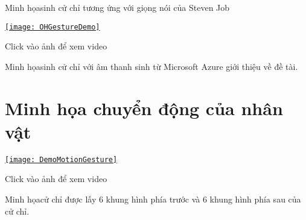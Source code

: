 Minh họasinh cử chỉ tương ứng với giọng nói của Steven Job


{
	\begin{center}
		\centering
		\href{https://youtu.be/yLwXdm7UgPE}{%
			\texttt{[image: OHGestureDemo]}}
		
		{\tiny Click vào ảnh để xem video}
	\end{center}
}

Minh họasinh cử chỉ với âm thanh sinh từ Microsoft Azure giới thiệu về đề tài.

\section{Minh họa chuyển động của nhân vật}

\begin{center}
{
	\centering
	\href{https://www.youtube.com/watch?v=9IIIZP3EJLg}{%
	\texttt{[image: DemoMotionGesture]}}
	
	{\tiny Click vào ảnh để xem video}
}
\end{center}
Minh họacử chỉ được lấy 6 khung hình phía trước và 6 khung hình phía sau của cử chỉ.